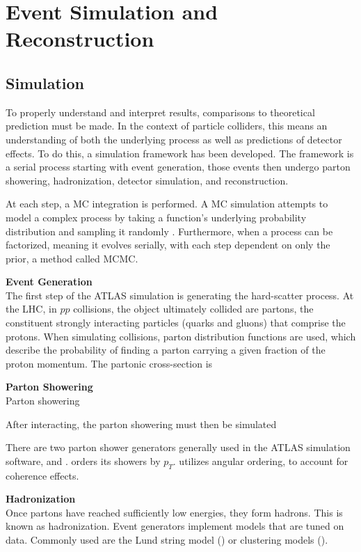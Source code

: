 \chapter{Event Simulation and Reconstruction}

\section{Simulation} \label{sec:simulation}

To properly understand and interpret results, comparisons to theoretical prediction must be made. In the context of particle colliders, this means an understanding of both the underlying process as well as predictions of detector effects. To do this, a simulation framework has been developed. The framework is a serial process starting with event generation, those events then undergo parton showering, hadronization, detector simulation, and reconstruction.

At each step, a \gls{MC} integration is performed. A \gls{MC} simulation attempts to model a complex process by taking a function's underlying probability distribution and sampling it randomly {\color{red}}. Furthermore, when a process can be factorized, meaning it evolves serially, with each step dependent on only the prior, a method called \gls{MCMC}.

\noindent\textbf{Event Generation}\\
\indent The first step of the ATLAS simulation is generating the hard-scatter process. At the \gls{LHC}, in $pp$ collisions, the object ultimately collided are partons, the constituent strongly interacting particles (quarks and gluons) that comprise the protons. When simulating collisions, parton distribution functions are used, which describe the probability of finding a parton carrying a given fraction of the proton momentum. The partonic cross-section is 


\noindent\textbf{Parton Showering}\\
\indent Parton showering 

After interacting, the parton showering must then be simulated

There are two parton shower generators generally used in the ATLAS simulation software, \PYTHIA and \HERWIG. \PYTHIA orders its showers by $p_{T}$. \HERWIG utilizes angular ordering, to account for coherence effects. 

\noindent\textbf{Hadronization}\\
\indent Once partons have reached sufficiently low energies, they form hadrons. This is known as hadronization. Event generators implement models that are tuned on data. Commonly used are the Lund string model \cite{lund-string} (\PYTHIA) or clustering models \cite{clustering-hadronization} (\HERWIG).

